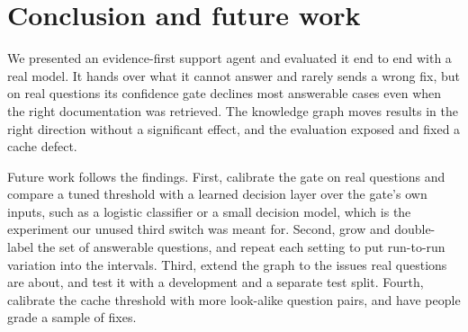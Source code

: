 \documentclass[cameraready]{ieeeconf}
\begin{document}
\section{Conclusion and future work}
We presented an evidence-first support agent and evaluated it end to end with a real model. It hands over what it cannot answer and rarely sends a wrong fix, but on real questions its confidence gate declines most answerable cases even when the right documentation was retrieved. The knowledge graph moves results in the right direction without a significant effect, and the evaluation exposed and fixed a cache defect.

Future work follows the findings. First, calibrate the gate on real questions and compare a tuned threshold with a learned decision layer over the gate's own inputs, such as a logistic classifier or a small decision model, which is the experiment our unused third switch was meant for. Second, grow and double-label the set of answerable questions, and repeat each setting to put run-to-run variation into the intervals. Third, extend the graph to the issues real questions are about, and test it with a development and a separate test split. Fourth, calibrate the cache threshold with more look-alike question pairs, and have people grade a sample of fixes.
\end{document}
